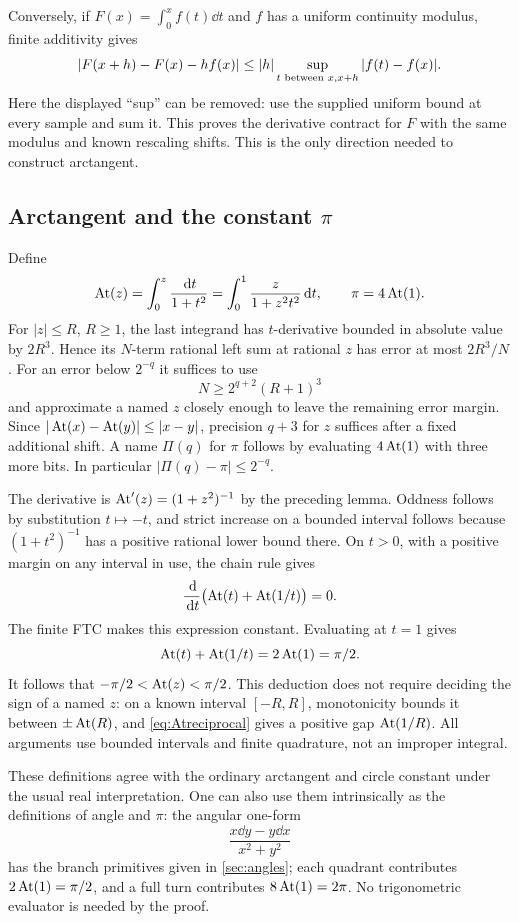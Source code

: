 Conversely, if $F(x)=\int_0^x f(t)\dd t$ and $f$ has a uniform continuity modulus, finite additivity gives
\[
\left|F(x+h)-F(x)-hf(x)\right|
\le |h|\sup_{t\text{ between }x,x+h}|f(t)-f(x)|.
\]
Here the displayed ``sup'' can be removed: use the supplied uniform bound at every sample and sum it. This proves the derivative contract for $F$ with the same modulus and known rescaling shifts. This is the only direction needed to construct arctangent.

\subsection{Arctangent and the constant \texorpdfstring{$\pi$}{pi}}

Define
\begin{equation}\label{eq:At}
\operatorname{At}(z)=\int_0^z\frac{\,\mathrm d t}{1+t^2}
=\int_0^1\frac{z}{1+z^2t^2}\,\mathrm d t,
\qquad \pi=4\operatorname{At}(1).
\end{equation}
For $|z|\le R$, $R\ge1$, the last integrand has $t$-derivative bounded in absolute value by $2R^3$. Hence its $N$-term rational left sum at rational $z$ has error at most $2R^3/N$. For an error below $2^{-q}$ it suffices to use
\[
N\ge2^{q+2}(R+1)^3
\]
and approximate a named $z$ closely enough to leave the remaining error margin. Since $|\operatorname{At}(x)-\operatorname{At}(y)|\le|x-y|$, precision $q+3$ for $z$ suffices after a fixed additional shift. A name $\Pi(q)$ for $\pi$ follows by evaluating $4\operatorname{At}(1)$ with three more bits. In particular $|\Pi(q)-\pi|\le2^{-q}$.

The derivative is $\operatorname{At}'(z)=(1+z^2)^{-1}$ by the preceding lemma. Oddness follows by substitution $t\mapsto-t$, and strict increase on a bounded interval follows because $(1+t^2)^{-1}$ has a positive rational lower bound there. On $t>0$, with a positive margin on any interval in use, the chain rule gives
\[
\frac{\,\mathrm d}{\,\mathrm d t}\bigl(\operatorname{At}(t)+\operatorname{At}(1/t)\bigr)=0.
\]
The finite FTC makes this expression constant. Evaluating at $t=1$ gives
\begin{equation}\label{eq:Atreciprocal}
\operatorname{At}(t)+\operatorname{At}(1/t)=2\operatorname{At}(1)=\pi/2.
\end{equation}
It follows that $-\pi/2<\operatorname{At}(z)<\pi/2$. This deduction does not require deciding the sign of a named $z$: on a known interval $[-R,R]$, monotonicity bounds it between $\pm\operatorname{At}(R)$, and \eqref{eq:Atreciprocal} gives a positive gap $\operatorname{At}(1/R)$. All arguments use bounded intervals and finite quadrature, not an improper integral.

These definitions agree with the ordinary arctangent and circle constant under the usual real interpretation. One can also use them intrinsically as the definitions of angle and $\pi$: the angular one-form
\[
\frac{x\dd y-y\dd x}{x^2+y^2}
\]
has the branch primitives given in \cref{sec:angles}; each quadrant contributes $2\operatorname{At}(1)=\pi/2$, and a full turn contributes $8\operatorname{At}(1)=2\pi$. No trigonometric evaluator is needed by the proof.

